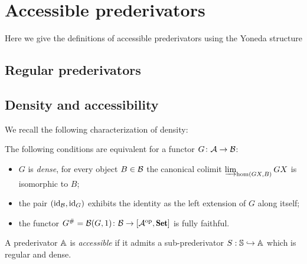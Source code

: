\section{Accessible prederivators} 
Here we give the definitions of accessible prederivators using the Yoneda structure
\subsection{Regular prederivators}

\subsection{Density and accessibility}
We recall the following characterization of density:
\begin{theorem}
The following conditions are equivalent  for a functor $G\colon \mathcal{A}\to \mathcal{B}$:
\begin{itemize}
	\item $G$ is \emph{dense}, \ie for every object $B\in\mathcal{B}$ the canonical colimit $\varinjlim_{\hom(GX,B)} GX$ is isomorphic to $B$;
	\item the pair $(\operatorname{id}_{\mathcal{B}}, \operatorname{id}_G)$ exhibits the identity as the left extension of $G$ along itself;
	\item the functor $G^\# = \B(G,1) \colon \B \to [\A^\opp, \Set]$ is fully faithful.
\end{itemize}
\end{theorem}
\begin{definition}
A prederivator $\mathbb{A}$ is \emph{accessible} if it admits a sub-prederivator $S : \mathbb{S} \hookrightarrow \mathbb{A}$ which is regular and dense.
\end{definition}
